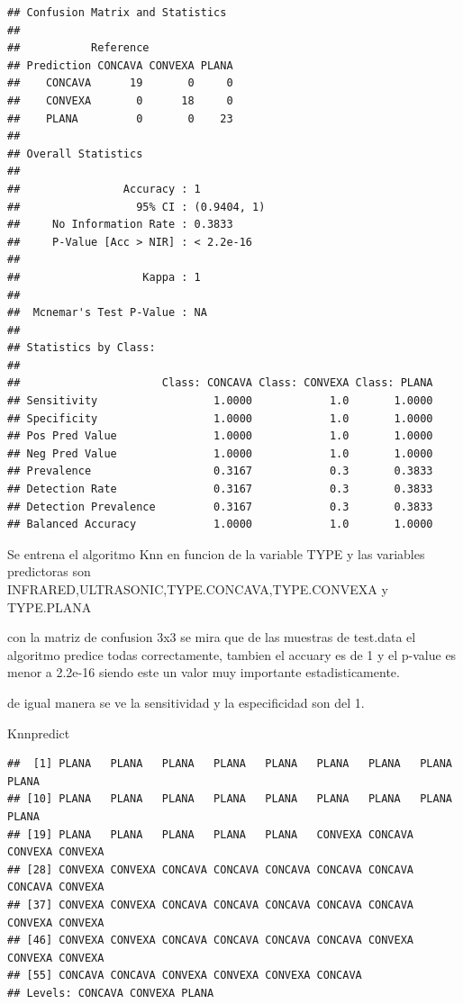 \documentclass[
]{article}
\newenvironment{Shaded}{\begin{snugshade}}{\end{snugshade}}
\newcommand{\NormalTok}[1]{#1}
\begin{document}
\begin{verbatim}
## Confusion Matrix and Statistics
## 
##           Reference
## Prediction CONCAVA CONVEXA PLANA
##    CONCAVA      19       0     0
##    CONVEXA       0      18     0
##    PLANA         0       0    23
## 
## Overall Statistics
##                                      
##                Accuracy : 1          
##                  95% CI : (0.9404, 1)
##     No Information Rate : 0.3833     
##     P-Value [Acc > NIR] : < 2.2e-16  
##                                      
##                   Kappa : 1          
##                                      
##  Mcnemar's Test P-Value : NA         
## 
## Statistics by Class:
## 
##                      Class: CONCAVA Class: CONVEXA Class: PLANA
## Sensitivity                  1.0000            1.0       1.0000
## Specificity                  1.0000            1.0       1.0000
## Pos Pred Value               1.0000            1.0       1.0000
## Neg Pred Value               1.0000            1.0       1.0000
## Prevalence                   0.3167            0.3       0.3833
## Detection Rate               0.3167            0.3       0.3833
## Detection Prevalence         0.3167            0.3       0.3833
## Balanced Accuracy            1.0000            1.0       1.0000
\end{verbatim}

Se entrena el algoritmo Knn en funcion de la variable TYPE y las
variables predictoras son INFRARED,ULTRASONIC,TYPE.CONCAVA,TYPE.CONVEXA
y TYPE.PLANA

con la matriz de confusion 3x3 se mira que de las muestras de test.data
el algoritmo predice todas correctamente, tambien el accuary es de 1 y
el p-value es menor a 2.2e-16 siendo este un valor muy importante
estadisticamente.

de igual manera se ve la sensitividad y la especificidad son del 1.

\begin{Shaded}
\begin{Highlighting}[]
\NormalTok{Knnpredict}
\end{Highlighting}
\end{Shaded}

\begin{verbatim}
##  [1] PLANA   PLANA   PLANA   PLANA   PLANA   PLANA   PLANA   PLANA   PLANA  
## [10] PLANA   PLANA   PLANA   PLANA   PLANA   PLANA   PLANA   PLANA   PLANA  
## [19] PLANA   PLANA   PLANA   PLANA   PLANA   CONVEXA CONCAVA CONVEXA CONVEXA
## [28] CONVEXA CONVEXA CONCAVA CONCAVA CONCAVA CONCAVA CONCAVA CONCAVA CONVEXA
## [37] CONVEXA CONVEXA CONCAVA CONCAVA CONCAVA CONCAVA CONCAVA CONVEXA CONVEXA
## [46] CONVEXA CONVEXA CONCAVA CONCAVA CONCAVA CONCAVA CONVEXA CONVEXA CONVEXA
## [55] CONCAVA CONCAVA CONVEXA CONVEXA CONVEXA CONCAVA
## Levels: CONCAVA CONVEXA PLANA
\end{verbatim}
\end{document}
